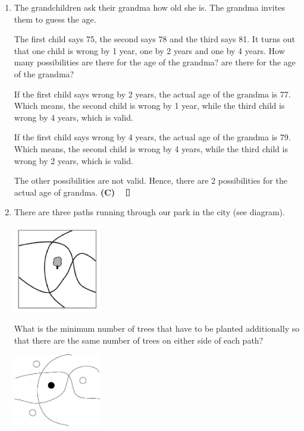 \documentclass{report}
\begin{document}
\begin{multicols}{2}
\begin{enumerate}
        \item The grandchildren ask their grandma how old she is. The grandma invites them to
              guess the age.

              The first child says 75, the second says 78 and the third says 81. It turns out
              that one child is wrong by 1 year, one by 2 years and one by 4 years. How many
              possibilities are there for the age of the grandma? are there for the age of
              the grandma?

              \sol{}

              If the first child says wrong by 2 years, the actual age of the grandma is 77.
              Which means, the second child is wrong by 1 year, while the third child is
              wrong by 4 years, which is valid.

              If the first child says wrong by 4 years, the actual age of the grandma is 79.
              Which means, the second child is wrong by 4 years, while the third child is
              wrong by 2 years, which is valid.

              The other possibilities are not valid. Hence, there are 2 possibilities for the
              actual age of grandma. \textbf{(C)} $\eos$

        \item There are three paths running through our park in the city (see diagram).
              \begin{center}
                  \includegraphics[width=0.3\textwidth]{pictures/16.png}
              \end{center}
              What is the minimum number of trees that have to be planted additionally so that there are the same number of trees on either side of each path?

              \sol{}

              \begin{center}
                  \includegraphics[width=0.3\textwidth]{pictures/17.jpg}
              \end{center}


\end{enumerate}
\end{multicols}
\end{document}
